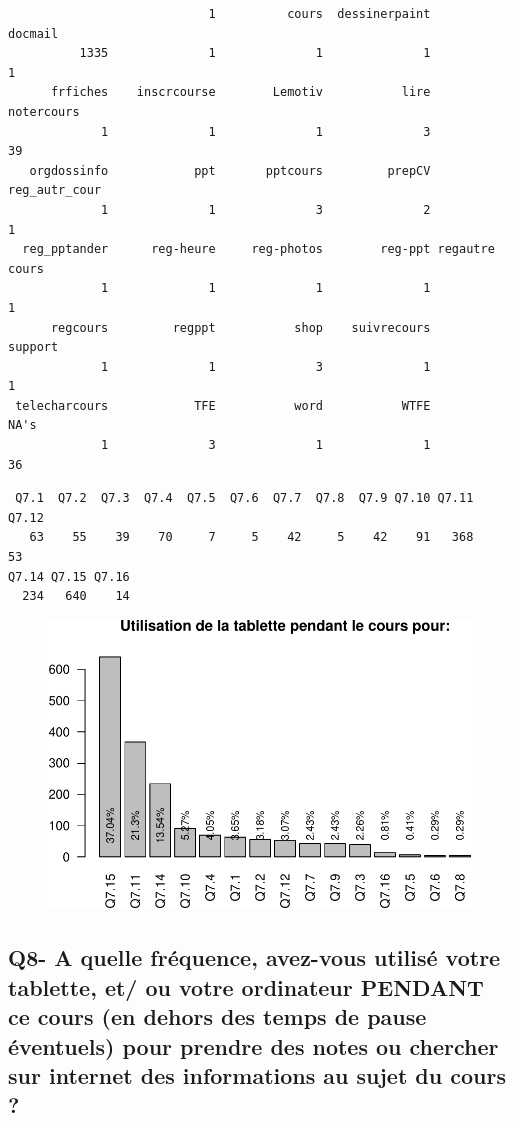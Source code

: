 \documentclass[]{article}
\begin{document}
\begin{verbatim}
                            1          cours  dessinerpaint        docmail 
          1335              1              1              1              1 
      frfiches    inscrcourse        Lemotiv           lire     notercours 
             1              1              1              3             39 
   orgdossinfo            ppt       pptcours         prepCV  reg_autr_cour 
             1              1              3              2              1 
  reg_pptander      reg-heure     reg-photos        reg-ppt regautre cours 
             1              1              1              1              1 
      regcours         regppt           shop    suivrecours        support 
             1              1              3              1              1 
 telecharcours            TFE           word           WTFE           NA's 
             1              3              1              1             36 
\end{verbatim}

\begin{verbatim}
 Q7.1  Q7.2  Q7.3  Q7.4  Q7.5  Q7.6  Q7.7  Q7.8  Q7.9 Q7.10 Q7.11 Q7.12 
   63    55    39    70     7     5    42     5    42    91   368    53 
Q7.14 Q7.15 Q7.16 
  234   640    14 
\end{verbatim}

\begin{figure}[htbp]
\centering
\includegraphics{qs_etudiants_files/figure-latex/q7-1.pdf}
\end{figure}

\subsection{Q8- A quelle fréquence, avez-vous utilisé votre tablette,
et/ ou votre ordinateur PENDANT ce cours (en dehors des temps de pause
éventuels) pour prendre des notes ou chercher sur internet des
informations au sujet du cours
?}\label{q8--a-quelle-frequence-avez-vous-utilise-votre-tablette-et-ou-votre-ordinateur-pendant-ce-cours-en-dehors-des-temps-de-pause-eventuels-pour-prendre-des-notes-ou-chercher-sur-internet-des-informations-au-sujet-du-cours}
\end{document}

